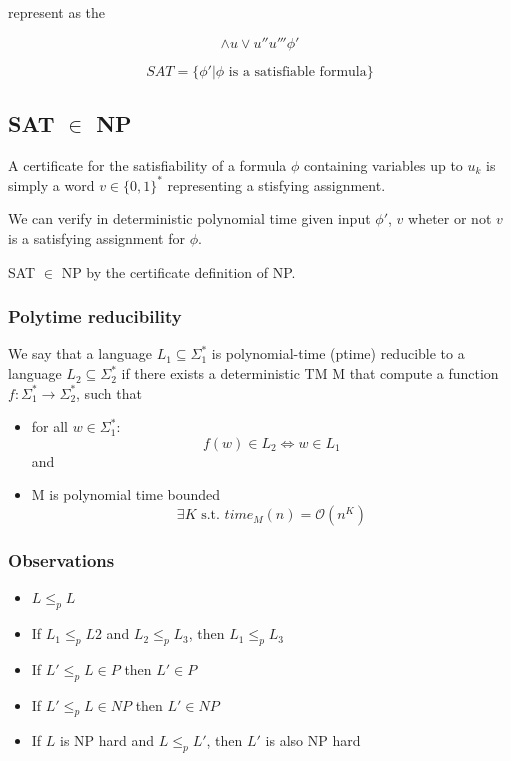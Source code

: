 \documentclass[a4paper,12pt]{article}
\theoremstyle{definition}
\theoremstyle{remark}
\begin{document}
represent as the

\begin{equation*}
    \land u \lor u'' u''' \phi'
\end{equation*}

\begin{equation*}
    SAT = \{\phi' | \phi \text{ is a satisfiable formula}\}
\end{equation*}

\subsection*{SAT $\in$ NP}

A certificate for the satisfiability of a formula $\phi$ containing variables up to $u_k$ is simply a word $v \in \{0, 1\}^*$
representing a stisfying assignment.

We can verify in deterministic polynomial time given input $\phi'$, $v$ wheter or not $v$ is a satisfying assignment for $\phi$.

SAT $\in$ NP by the certificate definition of NP.

\subsubsection*{Polytime reducibility}
We say that a language $L_1 \subseteq \Sigma_1^*$ is polynomial-time (ptime) reducible to a language $L_2 \subseteq \Sigma_2^*$ if there exists
a deterministic TM M that compute a function $f: \Sigma_1^* \to \Sigma_2^*$, such that
\begin{itemize}
    \item for all $w \in \Sigma_1^*$:
    \begin{equation*}
        f(w) \in L_2 \iff w \in L_1
    \end{equation*} and
    \item M is polynomial time bounded
    \begin{equation*}
        \exists K \text{ s.t. } time_M(n) = \mathscr{O}(n^K)
    \end{equation*}
\end{itemize}

\subsubsection*{Observations}
\begin{itemize}
    \item $L \leq_p L$
    \item If $L_1 \leq_p L2$ and $L_2 \leq_p L_3$, then $L_1 \leq_p L_3$
    \item If $L' \leq_p L \in P$ then $L' \in P$
    \item If $L' \leq_p L \in NP$ then $L' \in NP$
    \item If $L$ is NP hard and $L \leq_p L'$, then $L'$ is also NP hard
\end{itemize}
\end{document}
